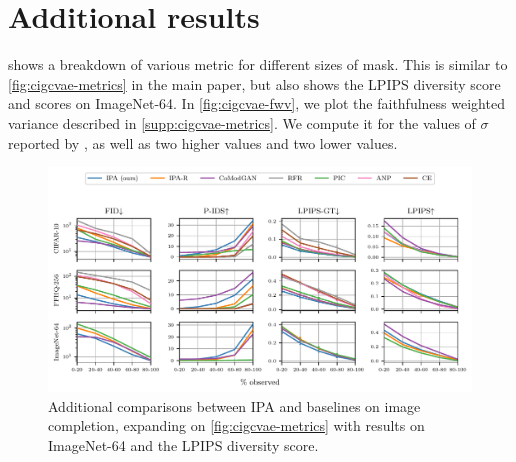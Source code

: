 \section{Additional results} \label{supp:cigcvae-additional-results}

 shows a breakdown of various metric for different sizes
of mask. This is similar to \cref{fig:cigcvae-metrics} in the main paper, but also shows
the LPIPS diversity score and scores on ImageNet-64. In \cref{fig:cigcvae-fwv}, we plot
the faithfulness weighted variance described in \cref{supp:cigcvae-metrics}. We compute
it for the values of $\sigma$ reported by \citet{li2020multimodal}, as well as
two higher values and two lower values.
\begin{figure}
  \includegraphics[width=\textwidth]{figs/cigcvae/extra-metrics}
  \caption{Additional comparisons between IPA and baselines on image completion, expanding on \cref{fig:cigcvae-metrics} with results on ImageNet-64 and the
    LPIPS diversity score.}
  \label{fig:cigcvae-extra-metrics}
\end{figure}

